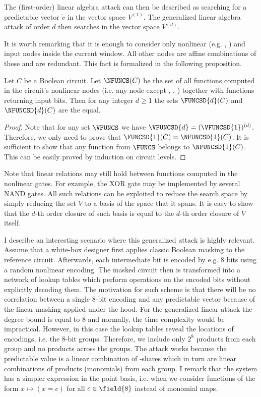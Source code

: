 The (first-order) linear algebra attack can then be described as searching for a predictable vector $\tilde{v}$ in the vector space $V^{(1)}$. 
The generalized linear algebra attack of order $d$ then searches in the vector space $V^{(d)}$.

It is worth remarking that it is enough to consider only nonlinear (e.g. \tand{}, \tor{}) and input nodes inside the current window. All other nodes are affine combinations of these and are redundant. This fact is formalized in the following proposition.

\begin{proposition}
Let $C$ be a Boolean circuit. Let $\NFUNCS(C)$ be the set of all functions computed in the circuit's nonlinear nodes (i.e. any node except \txor{}, \tnot{}, \tnxor{}) together with functions returning input bits. Then for any integer $d \ge 1$ the sets $\FUNCSD{d}(C)$ and $\NFUNCSD{d}(C)$ are the equal.
\end{proposition}
\begin{proof}
Note that for any set $\VFUNCS$ we have $\VFUNCSD{d} = (\VFUNCSD{1})^{(d)}$. Therefore, we only need to prove that $\FUNCSD{1}(C) = \NFUNCSD{1}(C)$. It is sufficient to show that any function from $\FUNCS$ belongs to $\NFUNCSD{1}(C)$. This can be easily proved by induction on circuit levels.
\end{proof}
\begin{remark}
Note that linear relations may still hold between functions computed in the nonlinear gates. For example, the XOR gate may be implemented by several NAND gates. All such relations can be exploited to reduce the search space by simply reducing the set $V$ to a basis of the space that it spans. It is easy to show that the $d$-th order closure of such basis is equal to the $d$-th order closure of $V$ itself.
\end{remark}

I describe an interesting scenario where this generalized attack is highly relevant. Assume that a white-box designer first applies classic Boolean masking to the reference circuit. Afterwards, each intermediate bit is encoded by e.g. 8 bits using a random nonlinear encoding. The masked circuit then is transformed into a network of lookup tables which perform operations on the encoded bits without explicitly decoding them. The motivation for such scheme is that there will be no correlation between a single 8-bit encoding and any predictable vector because of the linear masking applied under the hood. For the generalized linear attack the degree bound is equal to 8 and normally, the time complexity would be impractical. However, in this case the lookup tables reveal the locations of encodings, i.e. the 8-bit groups. Therefore, we include only $2^8$ products from each group and no products across the groups. The attack works because the predictable value is a linear combination of \txor{}-shares which in turn are linear combinations of products (monomials) from each group. I remark that the system has a simpler expression in the point basis, i.e. when we consider functions of the form $x \mapsto (x = c)$ for all $c \in \field{8}$ instead of monomial maps.

